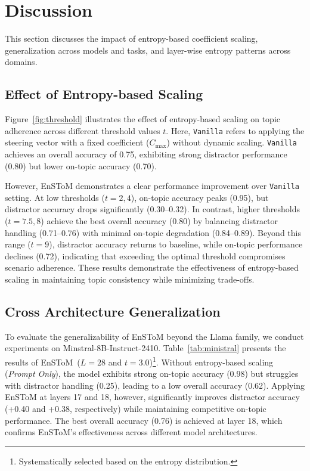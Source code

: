 \documentclass[11pt]{article}
\begin{document}
\section{Discussion}

This section discusses the impact of entropy-based coefficient scaling, generalization across models and tasks, and layer-wise entropy patterns across domains. 

\subsection{Effect of Entropy-based Scaling}
Figure~\ref{fig:threshold} illustrates the effect of entropy-based scaling on topic adherence across different threshold values \( t \). Here, \texttt{Vanilla} refers to applying the steering vector with a fixed coefficient (\( C_{\text{max}} \)) without dynamic scaling. \texttt{Vanilla} achieves an overall accuracy of 0.75, exhibiting strong distractor performance (0.80) but lower on-topic accuracy (0.70).

However, EnSToM demonstrates a clear performance improvement over \texttt{Vanilla} setting. At low thresholds (\( t = 2, 4 \)), on-topic accuracy peaks (0.95), but distractor accuracy drops significantly (0.30–0.32). In contrast, higher thresholds (\( t = 7.5, 8 \)) achieve the best overall accuracy (0.80) by balancing distractor handling (0.71–0.76) with minimal on-topic degradation (0.84–0.89). Beyond this range (\( t = 9 \)), distractor accuracy returns to baseline, while on-topic performance declines (0.72), indicating that exceeding the optimal threshold compromises scenario adherence. These results demonstrate the effectiveness of entropy-based scaling in maintaining topic consistency while minimizing trade-offs.



\subsection{Cross Architecture Generalization}
To evaluate the generalizability of EnSToM beyond the Llama family, we conduct experiments on Minstral-8B-Instruct-2410. Table~\ref{tab:ministral} presents the results of EnSToM~($L=28$ and $t=3.0$)\footnote{Systematically selected based on the entropy distribution.}. Without entropy-based scaling (\textit{Prompt Only}), the model exhibits strong on-topic accuracy (0.98) but struggles with distractor handling (0.25), leading to a low overall accuracy (0.62). Applying EnSToM at layers 17 and 18, however, significantly improves distractor accuracy (+0.40 and +0.38, respectively) while maintaining competitive on-topic performance. The best overall accuracy (0.76) is achieved at layer 18, which confirms EnSToM’s effectiveness across different model architectures.
\end{document}
